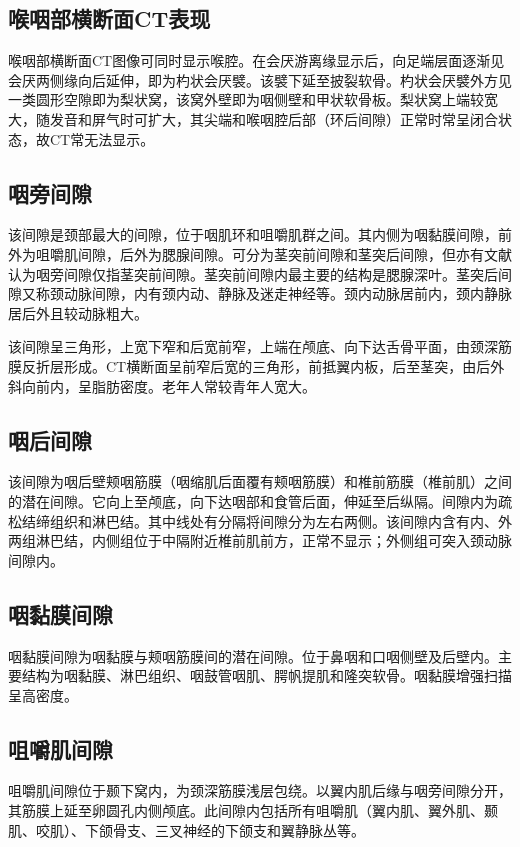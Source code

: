 \subsection{喉咽部横断面CT表现}

喉咽部横断面CT图像可同时显示喉腔。在会厌游离缘显示后，向足端层面逐渐见会厌两侧缘向后延伸，即为杓状会厌襞。该襞下延至披裂软骨。杓状会厌襞外方见一类圆形空隙即为梨状窝，该窝外壁即为咽侧壁和甲状软骨板。梨状窝上端较宽大，随发音和屏气时可扩大，其尖端和喉咽腔后部（环后间隙）正常时常呈闭合状态，故CT常无法显示。

\subsection{咽旁间隙}

该间隙是颈部最大的间隙，位于咽肌环和咀嚼肌群之间。其内侧为咽黏膜间隙，前外为咀嚼肌间隙，后外为腮腺间隙。可分为茎突前间隙和茎突后间隙，但亦有文献认为咽旁间隙仅指茎突前间隙。茎突前间隙内最主要的结构是腮腺深叶。茎突后间隙又称颈动脉间隙，内有颈内动、静脉及迷走神经等。颈内动脉居前内，颈内静脉居后外且较动脉粗大。

该间隙呈三角形，上宽下窄和后宽前窄，上端在颅底、向下达舌骨平面，由颈深筋膜反折层形成。CT横断面呈前窄后宽的三角形，前抵翼内板，后至茎突，由后外斜向前内，呈脂肪密度。老年人常较青年人宽大。

\subsection{咽后间隙}

该间隙为咽后壁颊咽筋膜（咽缩肌后面覆有颊咽筋膜）和椎前筋膜（椎前肌）之间的潜在间隙。它向上至颅底，向下达咽部和食管后面，伸延至后纵隔。间隙内为疏松结缔组织和淋巴结。其中线处有分隔将间隙分为左右两侧。该间隙内含有内、外两组淋巴结，内侧组位于中隔附近椎前肌前方，正常不显示；外侧组可突入颈动脉间隙内。

\subsection{咽黏膜间隙}

咽黏膜间隙为咽黏膜与颊咽筋膜间的潜在间隙。位于鼻咽和口咽侧壁及后壁内。主要结构为咽黏膜、淋巴组织、咽鼓管咽肌、腭帆提肌和隆突软骨。咽黏膜增强扫描呈高密度。

\subsection{咀嚼肌间隙}

咀嚼肌间隙位于颞下窝内，为颈深筋膜浅层包绕。以翼内肌后缘与咽旁间隙分开，其筋膜上延至卵圆孔内侧颅底。此间隙内包括所有咀嚼肌（翼内肌、翼外肌、颞肌、咬肌）、下颌骨支、三叉神经的下颌支和翼静脉丛等。


